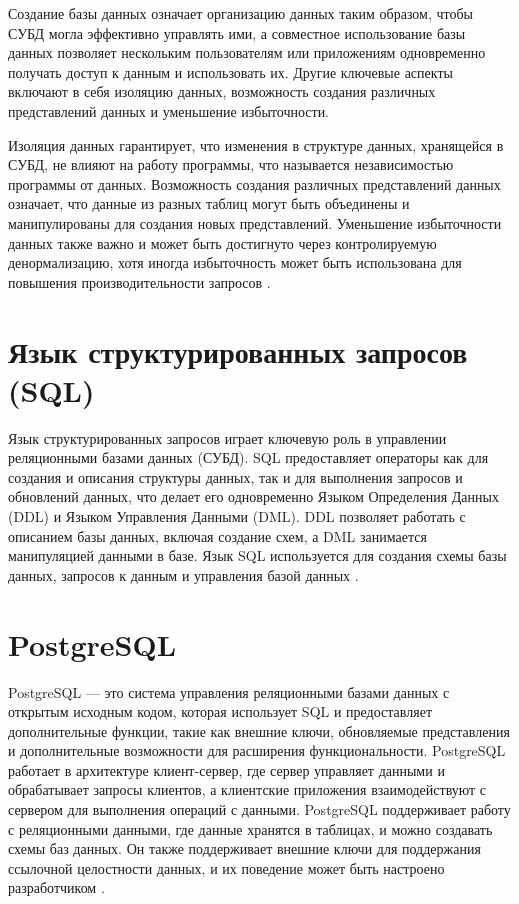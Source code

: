 \documentclass{bmstu}
\begin{document}
Создание базы данных означает организацию данных таким образом, чтобы СУБД могла эффективно управлять ими, а совместное использование базы данных позволяет нескольким пользователям или приложениям одновременно получать доступ к данным и использовать их. Другие ключевые аспекты включают в себя изоляцию данных, возможность создания различных представлений данных и уменьшение избыточности.

Изоляция данных гарантирует, что изменения в структуре данных, хранящейся в СУБД, не влияют на работу программы, что называется независимостью программы от данных. Возможность создания различных представлений данных означает, что данные из разных таблиц могут быть объединены и манипулированы для создания новых представлений. Уменьшение избыточности данных также важно и может быть достигнуто через контролируемую денормализацию, хотя иногда избыточность может быть использована для повышения производительности запросов \cite{thirdOptSQL}.


\section{Язык структурированных запросов (SQL)}
Язык структурированных запросов играет ключевую роль в управлении реляционными базами данных (СУБД). SQL предоставляет операторы как для создания и описания структуры данных, так и для выполнения запросов и обновлений данных, что делает его одновременно Языком Определения Данных (DDL) и Языком Управления Данными (DML). DDL позволяет работать с описанием базы данных, включая создание схем, а DML занимается манипуляцией данными в базе. Язык SQL используется для создания схемы базы данных, запросов к данным и управления базой данных \cite{thirdOptSQL}.


\section{PostgreSQL}
PostgreSQL --- это система управления реляционными базами данных с открытым исходным кодом, которая использует SQL и предоставляет дополнительные функции, такие как внешние ключи, обновляемые представления и дополнительные возможности для расширения функциональности. PostgreSQL работает в архитектуре клиент-сервер, где сервер управляет данными и обрабатывает запросы клиентов, а клиентские приложения взаимодействуют с сервером для выполнения операций с данными. PostgreSQL поддерживает работу с реляционными данными, где данные хранятся в таблицах, и можно создавать схемы баз данных. Он также поддерживает внешние ключи для поддержания ссылочной целостности данных, и их поведение может быть настроено разработчиком \cite{thirdOptSQL}.
\end{document}
